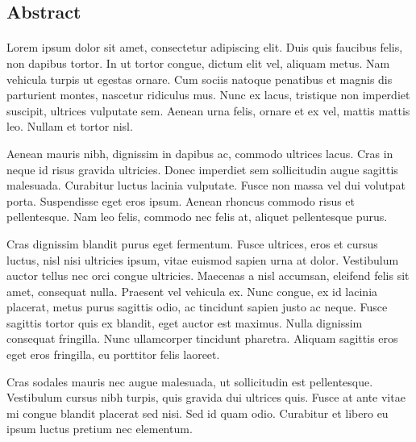 \newpage
{}
\begin{center}
\begin{minipage}[t]{0.7\textwidth}
\section*{Abstract}
\paragraph{}
Lorem ipsum dolor sit amet, consectetur adipiscing elit. Duis quis faucibus felis, non dapibus tortor. In ut tortor congue, dictum elit vel, aliquam metus. Nam vehicula turpis ut egestas ornare. Cum sociis natoque penatibus et magnis dis parturient montes, nascetur ridiculus mus. Nunc ex lacus, tristique non imperdiet suscipit, ultrices vulputate sem. Aenean urna felis, ornare et ex vel, mattis mattis leo. Nullam et tortor nisl.

Aenean mauris nibh, dignissim in dapibus ac, commodo ultrices lacus. Cras in neque id risus gravida ultricies. Donec imperdiet sem sollicitudin augue sagittis malesuada. Curabitur luctus lacinia vulputate. Fusce non massa vel dui volutpat porta. Suspendisse eget eros ipsum. Aenean rhoncus commodo risus et pellentesque. Nam leo felis, commodo nec felis at, aliquet pellentesque purus.

Cras dignissim blandit purus eget fermentum. Fusce ultrices, eros et cursus luctus, nisl nisi ultricies ipsum, vitae euismod sapien urna at dolor. Vestibulum auctor tellus nec orci congue ultricies. Maecenas a nisl accumsan, eleifend felis sit amet, consequat nulla. Praesent vel vehicula ex. Nunc congue, ex id lacinia placerat, metus purus sagittis odio, ac tincidunt sapien justo ac neque. Fusce sagittis tortor quis ex blandit, eget auctor est maximus. Nulla dignissim consequat fringilla. Nunc ullamcorper tincidunt pharetra. Aliquam sagittis eros eget eros fringilla, eu porttitor felis laoreet.

Cras sodales mauris nec augue malesuada, ut sollicitudin est pellentesque. Vestibulum cursus nibh turpis, quis gravida dui ultrices quis. Fusce at ante vitae mi congue blandit placerat sed nisi. Sed id quam odio. Curabitur et libero eu ipsum luctus pretium nec elementum. 
\end{minipage}
\end{center}
